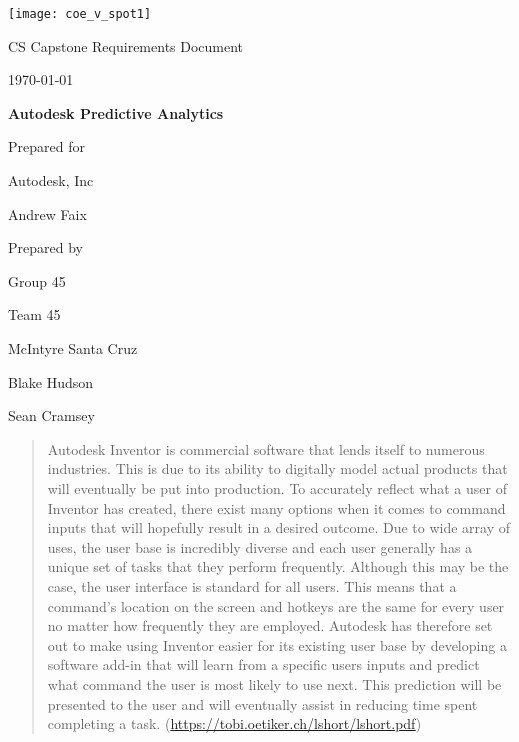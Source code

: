 \documentclass[onecolumn, draftclsnofoot,10pt, compsoc]{IEEEtran}
\def \CapstoneTeamName{		Team 45}
\def \CapstoneTeamNumber{		45}
\def \GroupMemberOne{			McIntyre Santa Cruz}
\def \GroupMemberTwo{			Blake Hudson}
\def \GroupMemberThree{			Sean Cramsey}
\def \CapstoneProjectName{		Autodesk Predictive Analytics}
\def \CapstoneSponsorCompany{	Autodesk, Inc}
\def \CapstoneSponsorPerson{		Andrew Faix}
\def \DocType{	
				Requirements Document
				}
\newcommand{\NameSigPair}[1]{\par
\makebox[2.75in][r]{#1} \hfil 	\makebox[3.25in]{\makebox[2.25in]{\hrulefill} \hfill		\makebox[.75in]{\hrulefill}}
\par\vspace{-12pt} \textit{\tiny\noindent
\makebox[2.75in]{} \hfil		\makebox[3.25in]{\makebox[2.25in][r]{Signature} \hfill	\makebox[.75in][r]{Date}}}}
\renewcommand{\NameSigPair}[1]{#1}
\begin{document}
\begin{titlepage}
    \begin{singlespace}
    	\texttt{[image: coe\_v\_spot1]}
        \hfill 
        \par\vspace{.2in}
        \centering
        \scshape{
            \huge CS Capstone \DocType \par
            {\large\today}\par
            \vspace{.5in}
            \textbf{\Huge\CapstoneProjectName}\par
            \vfill
            {\large Prepared for}\par
            \Huge \CapstoneSponsorCompany\par
            \vspace{5pt}
            {\Large\NameSigPair{\CapstoneSponsorPerson}\par}
            {\large Prepared by }\par
            Group\CapstoneTeamNumber\par
            \CapstoneTeamName\par 
            \vspace{5pt}
            {\Large
                \NameSigPair{\GroupMemberOne}\par
                \NameSigPair{\GroupMemberTwo}\par
                \NameSigPair{\GroupMemberThree}\par
            }
            \vspace{20pt}
        }
        \begin{abstract}
        	Autodesk Inventor is commercial software that lends itself to numerous industries. This is due to its ability to digitally model actual products that will eventually be put into production. To accurately reflect what a user of Inventor has created, there exist  many options when it comes to command inputs that will hopefully result in a desired outcome. Due to wide array of uses, the user base is incredibly diverse and each user generally has a unique set of tasks that they perform frequently. Although this may be the case, the user interface is standard for all users. This means that a command’s location on the screen and hotkeys are the same for every user no matter how frequently they are employed. Autodesk has therefore set out to make using Inventor easier for its existing user base by developing a software add-in that will learn from a specific users inputs and predict what command the user is most likely to use next. This prediction will be presented to the user and will eventually assist in reducing time spent completing a task.  (\url{https://tobi.oetiker.ch/lshort/lshort.pdf})
        \end{abstract}     
    \end{singlespace}
\end{titlepage}
\end{document}
